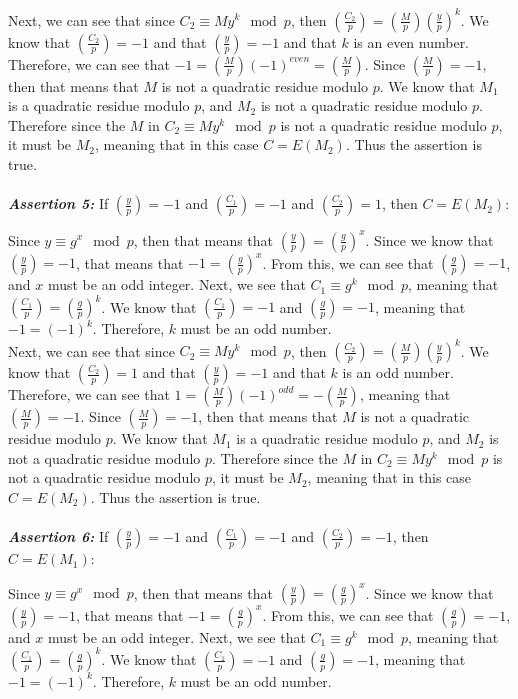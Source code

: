 \documentclass[11pt]{article}
\theoremstyle{definition}
\providecommand{\Leg}[2]{\genfrac{(}{)}{}{}{#1}{#2}}
\begin{document}
\begin{enumerate}
Next, we can see that since $C_2 \equiv My^k \mod{p}$, then $\Leg{C_2}{p} = \Leg{M}{p} \Leg{y}{p}^k$. We know that $\Leg{C_2}{p} = -1$ and that $\Leg{y}{p} = -1$ and that $k$ is an even number. Therefore, we can see that $-1 = \Leg{M}{p} (-1)^{even} = \Leg{M}{p}$. Since $\Leg{M}{p} = -1$, then that means that $M$ is not a quadratic residue modulo $p$. We know that $M_1$ is a quadratic residue modulo $p$, and $M_2$ is not a quadratic residue modulo $p$. Therefore since the $M$ in $C_2 \equiv My^k \mod{p}$ is not a quadratic residue modulo $p$, it must be $M_2$, meaning that in this case $C = E(M_2)$. Thus the assertion is true. \\ \\


\textbf{\textit{Assertion 5:}} If $\Leg{y}{p} = -1$ and $\Leg{C_1}{p} = -1$ and $\Leg{C_2}{p} = 1$, then $C = E(M_2)$:

Since $y \equiv g^x \mod{p}$, then that means that $\Leg{y}{p} = \Leg{g}{p}^x$. Since we know that $\Leg{y}{p} = -1$, that means that $-1 = \Leg{g}{p}^x$. From this, we can see that $\Leg{g}{p} = -1$, and $x$ must be an odd integer. Next, we see that $C_1 \equiv g^k \mod{p}$, meaning that $\Leg{C_1}{p} = \Leg{g}{p}^k$. We know that $\Leg{C_1}{p} = -1$ and $\Leg{g}{p} = -1$, meaning that $-1 = (-1)^k$. Therefore, $k$ must be an odd number. \\

Next, we can see that since $C_2 \equiv My^k \mod{p}$, then $\Leg{C_2}{p} = \Leg{M}{p} \Leg{y}{p}^k$. We know that $\Leg{C_2}{p} = 1$ and that $\Leg{y}{p} = -1$ and that $k$ is an odd number. Therefore, we can see that $1 = \Leg{M}{p} (-1)^{odd} = -\Leg{M}{p}$, meaning that $\Leg{M}{p} = -1$. Since $\Leg{M}{p} = -1$, then that means that $M$ is not a quadratic residue modulo $p$. We know that $M_1$ is a quadratic residue modulo $p$, and $M_2$ is not a quadratic residue modulo $p$. Therefore since the $M$ in $C_2 \equiv My^k \mod{p}$ is not a quadratic residue modulo $p$, it must be $M_2$, meaning that in this case $C = E(M_2)$. Thus the assertion is true. \\ \\


\textbf{\textit{Assertion 6:}} If $\Leg{y}{p} = -1$ and $\Leg{C_1}{p} = -1$ and $\Leg{C_2}{p} = -1$, then $C = E(M_1)$:

Since $y \equiv g^x \mod{p}$, then that means that $\Leg{y}{p} = \Leg{g}{p}^x$. Since we know that $\Leg{y}{p} = -1$, that means that $-1 = \Leg{g}{p}^x$. From this, we can see that $\Leg{g}{p} = -1$, and $x$ must be an odd integer. Next, we see that $C_1 \equiv g^k \mod{p}$, meaning that $\Leg{C_1}{p} = \Leg{g}{p}^k$. We know that $\Leg{C_1}{p} = -1$ and $\Leg{g}{p} = -1$, meaning that $-1 = (-1)^k$. Therefore, $k$ must be an odd number. \\


\end{enumerate}
\end{document}
